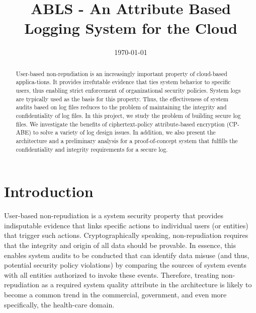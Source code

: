 \documentclass{sig-alternate}
\begin{document}
\title{ABLS - An Attribute Based Logging System for the Cloud}
\author{
}
\date{\today}
\maketitle
\begin{abstract}
User-based non-repudiation is an increasingly important property of cloud-based applica-tions. It provides irrefutable evidence that ties system behavior to specific users, thus enabling strict enforcement of organizational security policies. System logs are typically used as the basis for this property. Thus, the effectiveness of system audits based on log files reduces to the problem of maintaining the integrity and confidentiality of log files. In this project, we study the problem of building secure log files. We investigate the benefits of ciphertext-policy attribute-based encryption (CP-ABE) to solve a variety of log design issues. In addition, we also present the architecture and a preliminary analysis for a proof-of-concept system that fulfills the confidentiality and integrity requirements for a secure log.
\end{abstract}

\section{Introduction}
User-based non-repudiation is a system security property that provides indisputable evidence that links
specific actions to individual users (or entities) that trigger such actions. Cryptographically speaking, non-repudiation requires that the integrity and 
origin of all data should be provable. In essence, this enables system audits to be conducted that can
identify data misuse (and thus, potential security policy violations) by comparing the sources of system events
with all entities authorized to invoke these events. Therefore, treating non-repudiation as a required system 
quality attribute in the architecture is likely to become a common trend in the commercial, 
government, and even more specifically, the health-care domain.
\end{document}
